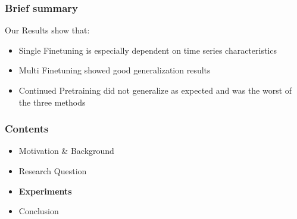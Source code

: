 \documentclass[t,aspectratio=169,svgnames]{beamer}
\begin{document}

\begin{frame}
\frametitle{Brief summary}
    Our Results show that:

    \begin{itemize}
        \setlength{\itemsep}{10pt}
        \item<2-> Single Finetuning is especially dependent on time series characteristics

        \item<3-> Multi Finetuning showed good generalization results

        \item<4-> Continued Pretraining did not generalize as expected and was the worst of the three methods

    \end{itemize}
\end{frame}

\begin{frame}
\frametitle{Contents}
\begin{itemize}
    \setlength{\itemsep}{10pt}
    \item Motivation \& Background
    \item Research Question
    \item \textbf{Experiments}
    \item Conclusion
\end{itemize}
\end{frame}
\end{document}
